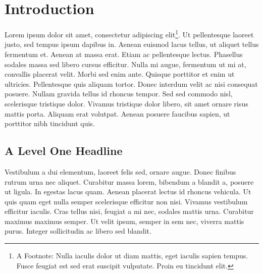 





\frontmatter
{}




\tableofcontents
\cleardoublepage
\cfoot*{}
\ofoot*{\pagemark}
\mainmatter

\hypertarget{introduction}{%
\chapter{Introduction}\label{introduction}}

Lorem ipsum dolor sit amet, consectetur adipiscing elit\footnote{A
  Footnote: Nulla iaculis dolor ut diam mattis, eget iaculis sapien
  tempus. Fusce feugiat est sed erat suscipit vulputate. Proin eu
  tincidunt elit.}. Ut pellentesque laoreet justo, sed tempus ipsum
dapibus in. Aenean euismod lacus tellus, ut aliquet tellus fermentum et.
Aenean at massa erat. Etiam ac pellentesque lectus. Phasellus sodales
massa sed libero cursus efficitur. Nulla mi augue, fermentum ut mi at,
convallis placerat velit. Morbi sed enim ante. Quisque porttitor et enim
ut ultricies. Pellentesque quis aliquam tortor. Donec interdum velit ac
nisi consequat posuere. Nullam gravida tellus id rhoncus tempor. Sed sed
commodo nisl, scelerisque tristique dolor. Vivamus tristique dolor
libero, sit amet ornare risus mattis porta. Aliquam erat volutpat.
Aenean posuere faucibus sapien, ut porttitor nibh tincidunt
quis.\citep{examplearticle2021}

\hypertarget{a-level-one-headline}{%
\section{A Level One Headline}\label{a-level-one-headline}}

Vestibulum a dui elementum, laoreet felis sed, ornare augue. Donec
finibus rutrum urna nec aliquet. Curabitur massa lorem, bibendum a
blandit a, posuere ut ligula. In egestas lacus quam. Aenean placerat
lectus id rhoncus vehicula. Ut quis quam eget nulla semper scelerisque
efficitur non nisi. Vivamus vestibulum efficitur iaculis. Cras tellus
nisi, feugiat a mi nec, sodales mattis urna. Curabitur maximus maximus
semper. Ut velit ipsum, semper in sem nec, viverra mattis purus. Integer
sollicitudin ac libero sed blandit.

